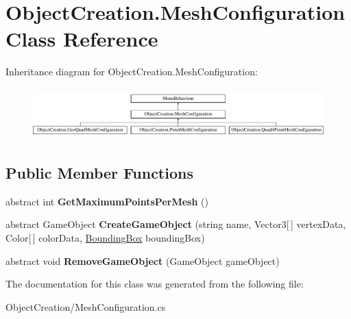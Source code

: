 \hypertarget{class_object_creation_1_1_mesh_configuration}{}\section{Object\+Creation.\+Mesh\+Configuration Class Reference}
\label{class_object_creation_1_1_mesh_configuration}
Inheritance diagram for Object\+Creation.\+Mesh\+Configuration\+:\begin{figure}[H]
\begin{center}
\leavevmode
\includegraphics[height=1.985816cm]{class_object_creation_1_1_mesh_configuration}
\end{center}
\end{figure}
\subsection*{Public Member Functions}
\begin{DoxyCompactItemize}
\item 
\mbox{\label{class_object_creation_1_1_mesh_configuration_ad5c68a195c3dcf49d75b3b6d57765265}} 
abstract int {\bfseries Get\+Maximum\+Points\+Per\+Mesh} ()
\item 
\mbox{\label{class_object_creation_1_1_mesh_configuration_a23fa629a42465c46ab797169344c233c}} 
abstract Game\+Object {\bfseries Create\+Game\+Object} (string name, Vector3\mbox{[}$\,$\mbox{]} vertex\+Data, Color\mbox{[}$\,$\mbox{]} color\+Data, \hyperlink{class_cloud_data_1_1_bounding_box}{Bounding\+Box} bounding\+Box)
\item 
\mbox{\label{class_object_creation_1_1_mesh_configuration_ad6658e84abae937703fdad3b7e64de6e}} 
abstract void {\bfseries Remove\+Game\+Object} (Game\+Object game\+Object)
\end{DoxyCompactItemize}


The documentation for this class was generated from the following file\+:\begin{DoxyCompactItemize}
\item 
Object\+Creation/Mesh\+Configuration.\+cs\end{DoxyCompactItemize}
